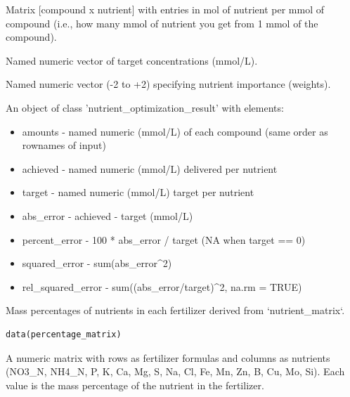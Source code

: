 \documentclass[a4paper]{book}
\begin{document}
%
\begin{Arguments}
\begin{ldescription}
\item[\code{nutrient\_matrix}] Matrix [compound x nutrient] with entries in mol of nutrient per mmol of compound
(i.e., how many mmol of nutrient you get from 1 mmol of the compound).

\item[\code{target}] Named numeric vector of target concentrations (mmol/L).

\item[\code{importance}] Named numeric vector (-2 to +2) specifying nutrient importance (weights).
\end{ldescription}
\end{Arguments}
%
\begin{Value}
An object of class 'nutrient\_optimization\_result' with elements:
\begin{itemize}

\item{} amounts - named numeric (mmol/L) of each compound (same order as rownames of input)
\item{} achieved - named numeric (mmol/L) delivered per nutrient
\item{} target - named numeric (mmol/L) target per nutrient
\item{} abs\_error - achieved - target (mmol/L)
\item{} percent\_error - 100 * abs\_error / target (NA when target == 0)
\item{} squared\_error - sum(abs\_error\textasciicircum{}2)
\item{} rel\_squared\_error - sum((abs\_error/target)\textasciicircum{}2, na.rm = TRUE)

\end{itemize}

\end{Value}
%
\begin{Description}
Mass percentages of nutrients in each fertilizer derived from `nutrient\_matrix`.
\end{Description}
%
\begin{Usage}
\begin{verbatim}
data(percentage_matrix)
\end{verbatim}
\end{Usage}
%
\begin{Format}
A numeric matrix with rows as fertilizer formulas and columns as nutrients
(NO3\_N, NH4\_N, P, K, Ca, Mg, S, Na, Cl, Fe, Mn, Zn, B, Cu, Mo, Si). Each value
is the mass percentage of the nutrient in the fertilizer.
\end{Format}
\end{document}
